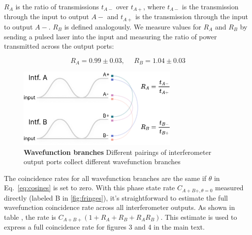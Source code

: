 \documentclass[11pt]{caltech_thesis} %
\begin{document}
$R_A$ is the ratio of transmissions $t_{A-}$ over $t_{A+}$, where $t_{A-}$ is the transmission through the input to output $A-$ and $t_{A+}$ is the transmission through the input to output $A-$. $R_B$ is defined analogously. We measure values for $R_A$ and $R_B$ by sending a pulsed laser into the input and measuring the ratio of power transmitted across the output ports:

$$R_A = 0.99 \pm 0.03, ~~~~~~ R_B = 1.04 \pm 0.03$$

\hypertarget{fig:branches}{%
\begin{figure}
\centering
\includegraphics[width=0.7\textwidth,height=\textheight]{./chapter_05/figs/branches_light.pdf}
\caption[{Wavefunction branches}]{\textbf{Wavefunction branches} Different pairings of interferometer output ports collect different wavefunction branches}
\label{fig:branches}
\end{figure}
}

The coincidence rates for all wavefunction branches are the same if $\theta$ in Eq.~\ref{eq:cosines} is set to zero. With this phase state rate $C_{A+ B+, \theta=0}$ measured directly (labeled B in \ref{fig:fringes}), it's straightforward to estimate the full wavefunction coincidence rate across all interferometer outputs. As shown in table \textcite{table:rates}, the rate is $C_{A+ B+}(1 + R_A + R_B + R_AR_B)$. This estimate is used to express a full coincidence rate for figures 3 and 4 in the main text.
\end{document}
